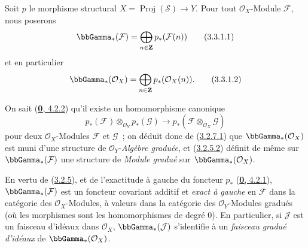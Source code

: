 \begin{env}[3.3.1]
\label{II.3.3.1-fr}
Soit $p$ le morphisme structural $X=\operatorname{Proj}(\mathcal{S})\to Y$.
Pour tout $\mathcal{O}_X$-Module $\mathcal{F}$, nous poserons
\[
\label{II.3.3.1.1-fr}
  \bbGamma_*(\mathcal{F})
  =\bigoplus_{n\in\mathbf{Z}}p_*(\mathcal{F}(n))
\tag{3.3.1.1}
\]
et en particulier
\[
\label{II.3.3.1.2-fr}
  \bbGamma_*(\mathcal{O}_X)
  =\bigoplus_{n\in\mathbf{Z}}p_*(\mathcal{O}_X(n)).
\tag{3.3.1.2}
\]

On sait (\hyperref[0.4.2.2-fr]{\textbf{0}, 4.2.2}) qu'il existe un homomorphisme
canonique
\[
  p_*(\mathcal{F})\otimes_{\mathcal{O}_Y}p_*(\mathcal{G})
  \longrightarrow
  p_*(\mathcal{F}\otimes_{\mathcal{O}_X}\mathcal{G})
\]
pour deux $\mathcal{O}_X$-Modules $\mathcal{F}$ et $\mathcal{G}$~; on déduit
donc de (\hyperref[II.3.2.7.1-fr]{3.2.7.1}) que
$\bbGamma_*(\mathcal{O}_X)$ est muni d'une structure de
$\mathcal{O}_Y$-\emph{Algèbre graduée}, et
(\hyperref[II.3.2.5.2-fr]{3.2.5.2}) définit de même sur
$\bbGamma_*(\mathcal{F})$ une structure de \emph{Module gradué} sur
$\bbGamma_*(\mathcal{O}_X)$.

En vertu de (\hyperref[II.3.2.5-fr]{3.2.5}), et de l'exactitude à gauche du
foncteur $p_*$ (\hyperref[0.4.2.1-fr]{\textbf{0}, 4.2.1}),
$\bbGamma_*(\mathcal{F})$ est un foncteur covariant additif et
\emph{exact à gauche} en $\mathcal{F}$ dans la catégorie des
$\mathcal{O}_X$-Modules, à valeurs dans la catégorie des
$\mathcal{O}_Y$-Modules gradués (où les morphismes sont les homomorphismes de
degré $0$). En particulier, si $\mathcal{J}$ est un faisceau d'idéaux dans
$\mathcal{O}_X$, $\bbGamma_*(\mathcal{J})$ s'identifie à un
\emph{faisceau gradué d'idéaux} de $\bbGamma_*(\mathcal{O}_X)$.
\end{env}

